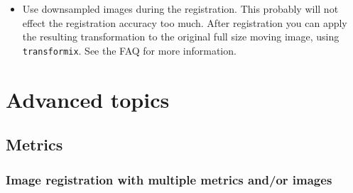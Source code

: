 \documentclass[]{report}
\newcommand{\transformix}{\texttt{transformix}}
\begin{document}
\begin{itemize}
\item Use downsampled images during the registration. This probably
will not effect the registration accuracy too much. After
registration you can apply the resulting transformation to the
original full size moving image, using \transformix. See the FAQ for
more information.

\end{itemize}

%


\chapter{Advanced topics}\label{chp:advanced}

\section{Metrics}

\subsection{Image registration with multiple metrics and/or images}
\end{document}
